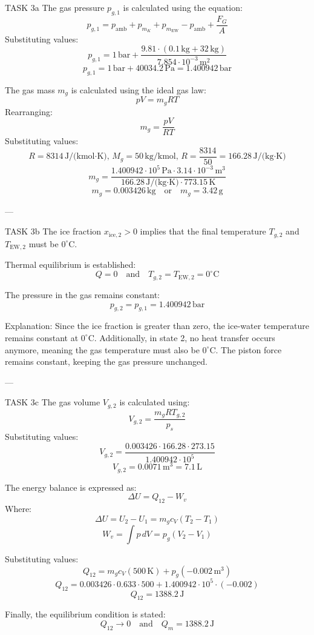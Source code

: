 TASK 3a  
The gas pressure \( p_{g,1} \) is calculated using the equation:  
\[
p_{g,1} = p_{\text{amb}} + p_{m_K} + p_{m_{\text{EW}}} - p_{\text{amb}} + \frac{F_G}{A}
\]  
Substituting values:  
\[
p_{g,1} = 1 \, \text{bar} + \frac{9.81 \cdot (0.1 \, \text{kg} + 32 \, \text{kg})}{7.854 \cdot 10^{-3} \, \text{m}^2}
\]  
\[
p_{g,1} = 1 \, \text{bar} + 40034.2 \, \text{Pa} = 1.400942 \, \text{bar}
\]  

The gas mass \( m_g \) is calculated using the ideal gas law:  
\[
p V = m_g R T
\]  
Rearranging:  
\[
m_g = \frac{p V}{R T}
\]  
Substituting values:  
\[
R = 8314 \, \text{J/(kmol·K)}, \, M_g = 50 \, \text{kg/kmol}, \, R = \frac{8314}{50} = 166.28 \, \text{J/(kg·K)}
\]  
\[
m_g = \frac{1.400942 \cdot 10^5 \, \text{Pa} \cdot 3.14 \cdot 10^{-3} \, \text{m}^3}{166.28 \, \text{J/(kg·K)} \cdot 773.15 \, \text{K}}
\]  
\[
m_g = 0.003426 \, \text{kg} \quad \text{or} \quad m_g = 3.42 \, \text{g}
\]  

---

TASK 3b  
The ice fraction \( x_{\text{ice},2} > 0 \) implies that the final temperature \( T_{g,2} \) and \( T_{\text{EW},2} \) must be \( 0^\circ\text{C} \).  

Thermal equilibrium is established:  
\[
Q = 0 \quad \text{and} \quad T_{g,2} = T_{\text{EW},2} = 0^\circ\text{C}
\]  

The pressure in the gas remains constant:  
\[
p_{g,2} = p_{g,1} = 1.400942 \, \text{bar}
\]  

Explanation: Since the ice fraction is greater than zero, the ice-water temperature remains constant at \( 0^\circ\text{C} \). Additionally, in state 2, no heat transfer occurs anymore, meaning the gas temperature must also be \( 0^\circ\text{C} \). The piston force remains constant, keeping the gas pressure unchanged.  

---

TASK 3c  
The gas volume \( V_{g,2} \) is calculated using:  
\[
V_{g,2} = \frac{m_g R T_{g,2}}{p_s}
\]  
Substituting values:  
\[
V_{g,2} = \frac{0.003426 \cdot 166.28 \cdot 273.15}{1.400942 \cdot 10^5}
\]  
\[
V_{g,2} = 0.0071 \, \text{m}^3 = 7.1 \, \text{L}
\]  

The energy balance is expressed as:  
\[
\Delta U = Q_{12} - W_v
\]  
Where:  
\[
\Delta U = U_2 - U_1 = m_g c_V (T_2 - T_1)
\]  
\[
W_v = \int p \, dV = p_g (V_2 - V_1)
\]  

Substituting values:  
\[
Q_{12} = m_g c_V (500 \, \text{K}) + p_g (-0.002 \, \text{m}^3)
\]  
\[
Q_{12} = 0.003426 \cdot 0.633 \cdot 500 + 1.400942 \cdot 10^5 \cdot (-0.002)
\]  
\[
Q_{12} = 1388.2 \, \text{J}
\]  

Finally, the equilibrium condition is stated:  
\[
Q_{12} \to 0 \quad \text{and} \quad Q_m = 1388.2 \, \text{J}
\]